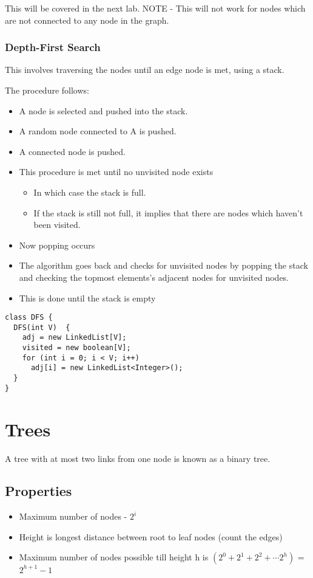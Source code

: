 \documentclass[11pt]{article}
\begin{document}
This will be covered in the next lab.
 NOTE - This will not work for nodes which are not connected to any node in the graph.
\subsubsection{Depth-First Search}
\label{sec:orgff90284}

This involves traversing the nodes until an edge node is met, using a stack.

The procedure follows:
\begin{itemize}
\item A node is selected and pushed into the stack.
\item A random node connected to A is pushed.
\item A connected node is pushed.
\item This procedure is met until no unvisited node exists
\begin{itemize}
\item In which case the stack is full.
\item If the stack is still not full, it implies that there are nodes which haven't been visited.
\end{itemize}
\item Now popping occurs
\item The algorithm goes back and checks for unvisited nodes by popping the stack and checking the topmost elements's adjacent nodes for unvisited nodes.
\item This is done until the stack is empty
\end{itemize}

\begin{verbatim}
class DFS {
  DFS(int V)  {
    adj = new LinkedList[V];
    visited = new boolean[V];
    for (int i = 0; i < V; i++)
      adj[i] = new LinkedList<Integer>();
  }
}
\end{verbatim}
\section{Trees}
\label{sec:org75825f6}
A tree with at most two links from one node is known as a binary tree.
\subsection{Properties}
\label{sec:orgd4c9c50}
\begin{itemize}
\item Maximum number of nodes - \(2^i\)
\item Height is longest distance between root to leaf nodes (count the edges)
\item Maximum number of nodes possible till height h is \((2^0 + 2^1 + 2^2 + \cdots 2^h)\) = \(2^{h+1} -1\)
\end{itemize}
\end{document}
